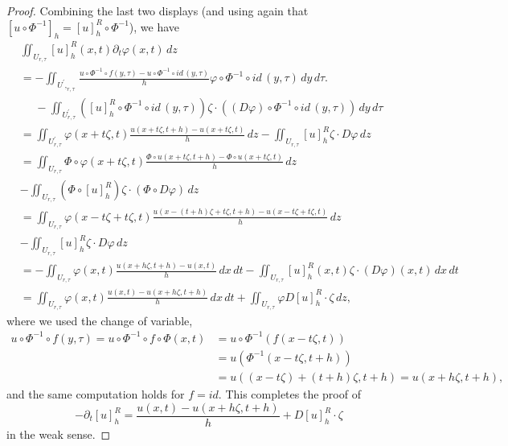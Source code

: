 \documentclass[notitlepage,11pt,reqno]{amsart}
\theoremstyle{definition}
\numberwithin{equation}{section}
\begin{document}
\begin{proof}
Combining the last two displays (and using again that $[u\circ\Phi^{-1}]_{h}=[u]_{h}^{R}\circ\Phi^{-1}$),
we have
\begin{align*}
&\iint_{U_{r, \tau}}[u]_{h}^{R}(x, t)\partial_{t}\varphi(x, t)\,dz\\
& =-\iint_{U^{\prime}, _{r, \tau}}\frac{u\circ\Phi^{-1}\circ f(y,\tau)-u\circ\Phi^{-1}\circ id\, (y,\tau)}{h}\varphi\circ\Phi^{-1}\circ id\, (y,\tau)\,dy\,d\tau.\\
 & \phantom{=}-\iint_{U^{\prime}_{r, \tau}}([u]_{h}^{R}\circ\Phi^{-1}\circ id\,(y, \tau))\zeta\cdot((D\varphi)\circ\Phi^{-1}\circ id\, (y, \tau))\,dy\, d\tau\\
&=\iint_{U^{\prime}_{r, \tau}}\varphi(x+t\zeta, t)\frac{u(x+t\zeta, t+h)-u(x+t\zeta, t)}{h}\, dz-\iint_{U_{r, \tau}}[u]^{R}_h \zeta\cdot D\varphi\, dz\\
&=\iint_{U_{r, \tau}}\Phi\circ \varphi(x+t \zeta, t)\frac{\Phi \circ u(x+t\zeta, t+h)-\Phi \circ u(x+t\zeta, t)}{h}\, dz\\
&-\iint_{U_{r, \tau}}(\Phi \circ [u]^{R}_h) \zeta\cdot (\Phi \circ D\varphi)\, dz\\
&=\iint_{U_{r, \tau}}\varphi(x-t\zeta +t\zeta, t)\frac{u(x-(t+h)\zeta+t\zeta, t+h)-u(x-t\zeta +t\zeta, t)}{h}\, dz\\
&-\iint_{U_{r, \tau}}[u]^{R}_h \zeta\cdot D\varphi\, dz \\
 & =-\iint_{U_{r, \tau}}\varphi(x,t)\frac{ u(x+h \zeta,t+h)- u(x,t)}{h}\,dx\, dt-\iint_{U_{r, \tau}}[u]_{h}^{R}(x, t)\zeta\cdot (D\varphi)(x, t)\, dx \, dt\\
 & =\iint_{U_{r, \tau}}\varphi(x,t)\frac{u(x,t)-u(x+h\zeta,t+h)}{h}\, dx\, dt+\iint_{U_{r, \tau}}\varphi D[u]_{h}^{R}\cdot\zeta\,dz,
\end{align*}
where we used the change of variable,
\begin{align*}
 u\circ\Phi^{-1}\circ f(y, \tau)=u\circ\Phi^{-1}\circ f\circ\Phi(x,t)&=u\circ\Phi^{-1}(f(x-t\zeta,t))\\
    &=u(\Phi^{-1}(x-t\zeta,t+h))\\
   &=u((x-t\zeta)+(t+h)\zeta,t+h)  =u(x+h\zeta, t+h),   
\end{align*}
and the same computation holds for $f=id.$
This completes the proof of $$-\partial_{t}[u]^{R}_h=\frac{u(x,t)-u(x+h \zeta,t+h)}{h}+D[u]_{h}^{R}\cdot\zeta$$
in the weak sense.
\end{proof}
\end{document}
